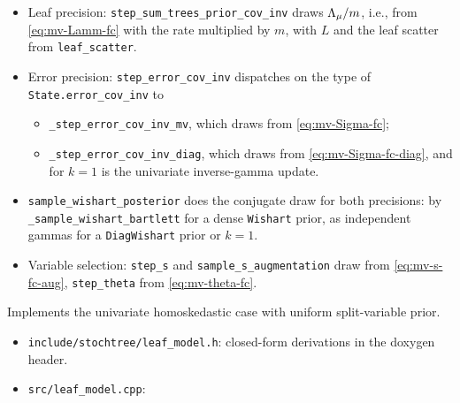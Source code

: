 \begin{description}
\begin{description}
\begin{itemize}
\begin{itemize}
				                        compute \eqref{eq:mv-lkratio-grow}.
			                  \end{itemize}
			            \item Leaf precision:
			                  \texttt{step\_sum\_trees\_prior\_cov\_inv} draws
			                  $\Lambda_{\mu} / m$, i.e., from \eqref{eq:mv-Lamm-fc}
			                  with the rate multiplied by $m$, with $L$ and
			                  the leaf scatter from \texttt{leaf\_scatter}.
			            \item Error precision: \texttt{step\_error\_cov\_inv}
			                  dispatches on the type of
			                  \texttt{State.error\_cov\_inv} to
			                  \begin{itemize}
				                  \item \texttt{\_step\_error\_cov\_inv\_mv},
				                        which draws from
				                        \eqref{eq:mv-Sigma-fc};
				                  \item \texttt{\_step\_error\_cov\_inv\_diag},
				                        which draws from
				                        \eqref{eq:mv-Sigma-fc-diag}, and
				                        for $k = 1$ is the univariate
				                        inverse-gamma update.
			                  \end{itemize}
			            \item \texttt{sample\_wishart\_posterior} does the
			                  conjugate draw for both precisions: by
			                  \texttt{\_sample\_wishart\_bartlett} for a dense
			                  \texttt{Wishart} prior, as independent gammas
			                  for a \texttt{DiagWishart} prior or $k = 1$.
			            \item Variable selection: \texttt{step\_s} and
			                  \texttt{sample\_s\_augmentation} draw from
			                  \eqref{eq:mv-s-fc-aug}, \texttt{step\_theta}
			                  from \eqref{eq:mv-theta-fc}.
		            \end{itemize}
	      \end{description}
	\item[stochtree] Implements the univariate homoskedastic case with
	      uniform split-variable prior.
	      \begin{itemize}
		      \item \texttt{include/stochtree/leaf\_model.h}: closed-form
		            derivations in the doxygen header.
		      \item \texttt{src/leaf\_model.cpp}:

\end{itemize}
\end{description}
